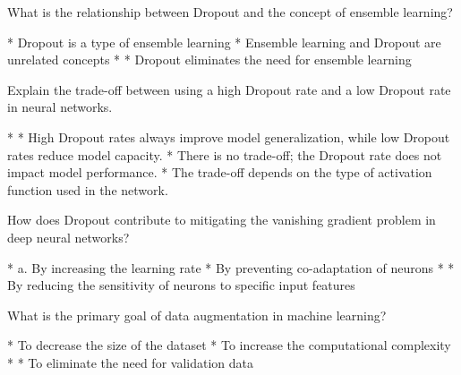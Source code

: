 \documentclass[11pt]{extarticle}
\begin{document}
\begin{exercise}
    What is the relationship between Dropout and the concept of ensemble learning?
    \begin{choice}
        * Dropout is a type of ensemble learning
        * Ensemble learning and Dropout are unrelated concepts
        * 
        * Dropout eliminates the need for ensemble learning
    \end{choice}
\end{exercise}
\begin{solution}
\end{solution}

\begin{exercise}
    Explain the trade-off between using a high Dropout rate and a low Dropout rate in neural networks.
    \begin{choice}
        * 
        * High Dropout rates always improve model generalization, while low Dropout rates reduce model capacity.
        * There is no trade-off; the Dropout rate does not impact model performance.
        * The trade-off depends on the type of activation function used in the network.
    \end{choice}
\end{exercise}
\begin{solution}
\end{solution}

\begin{exercise}
    How does Dropout contribute to mitigating the vanishing gradient problem in deep neural networks?
    \begin{choice}
        * a. By increasing the learning rate
        * By preventing co-adaptation of neurons
        * 
        * By reducing the sensitivity of neurons to specific input features
    \end{choice}
\end{exercise}
\begin{solution}
\end{solution}

\begin{exercise}
    What is the primary goal of data augmentation in machine learning?
    \begin{choice}
        * To decrease the size of the dataset
        * To increase the computational complexity
        * 
        * To eliminate the need for validation data
    \end{choice}
\end{exercise}
\begin{solution}
\end{solution}
\end{document}
